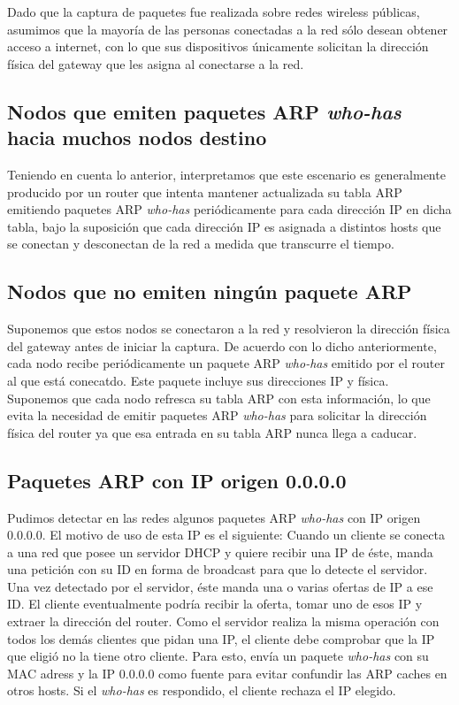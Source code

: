 \documentclass[a4paper, 10pt, twoside]{article}
\begin{document}
Dado que la captura de paquetes fue realizada sobre redes wireless públicas, asumimos que la mayoría de las personas conectadas a la red sólo desean obtener acceso a internet, con lo que sus dispositivos únicamente solicitan la dirección física del gateway que les asigna al conectarse a la red.


\subsection{Nodos que emiten paquetes ARP \textit{who-has} hacia muchos nodos destino}

Teniendo en cuenta lo anterior, interpretamos que este escenario es generalmente producido por un router que intenta mantener actualizada su tabla ARP emitiendo paquetes ARP \textit{who-has} periódicamente para cada dirección IP en dicha tabla, bajo la suposición que cada dirección IP es asignada a distintos hosts que se conectan y desconectan de la red a medida que transcurre el tiempo.


\subsection{Nodos que no emiten ningún paquete ARP}

Suponemos que estos nodos se conectaron a la red y resolvieron la dirección física del gateway antes de iniciar la captura. De acuerdo con lo dicho anteriormente, cada nodo recibe periódicamente un paquete ARP \textit{who-has} emitido por el router al que está conecatdo. Este paquete incluye sus direcciones IP y física. Suponemos que cada nodo refresca su tabla ARP con esta información, lo que evita la necesidad de emitir paquetes ARP \textit{who-has} para solicitar la dirección física del router ya que esa entrada en su tabla ARP nunca llega a caducar.


\subsection{Paquetes ARP con IP origen 0.0.0.0}

Pudimos detectar en las redes algunos paquetes ARP \textit{who-has} con IP origen 0.0.0.0.
El motivo de uso de esta IP es el siguiente:
Cuando un cliente se conecta a una red que posee un servidor DHCP y quiere recibir una IP de éste, manda una petición con su ID en forma de broadcast para que lo detecte el servidor. Una vez detectado por el servidor, éste manda una o varias ofertas de IP a ese ID.
El cliente eventualmente podría recibir la oferta, tomar uno de esos IP y extraer la dirección del router.
Como el servidor realiza la misma operación con todos los demás clientes que pidan una IP, el cliente debe comprobar que la IP que eligió no la tiene otro cliente. Para esto, envía un paquete \textit{who-has} con su MAC adress y la IP 0.0.0.0 como fuente para evitar confundir las ARP caches en otros hosts. Si el \textit{who-has} es respondido, el cliente rechaza el IP elegido.
\end{document}
